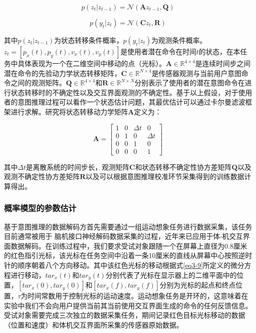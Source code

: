 \begin{equation}
\label{eq7}
p({z_t}|{z_{t - 1}}) = \mathcal{N}({\mathbf{A}}{z_{t - 1}},{{\mathbf{Q}}})
\end{equation}   

\begin{equation}
\label{eq8}
p({y_t}|{z_t}) = \mathcal{N}({\mathbf{C}}{z_t},{{\mathbf{R}}})
\end{equation}    

其中$p({z_t}|{z_{t - 1}})$为状态转移条件概率，$p({y_t}|{z_t})$为观测条件概率。${z_t} = [{p_x}(t),{p_y}(t),{v_x}(t),{v_y}(t)]$是使用者潜在命令在时间$t$的状态，在本任务中具体表现为一个在二维空间中移动的点（光标）。${\mathbf{A}} \in {\mathbb{R}^{4 \times 4}}$是连续时间步之间潜在命令的先验动力学状态转移矩阵，${\mathbf{C}} \in {\mathbb{R}^{N \times 4}}$是传感器观测与当前用户意图命令之间的观测矩阵。${{\mathbf{Q}}} \in {\mathbb{R}^{4 \times 4}}$和${{\mathbf{R}}} \in {\mathbb{R}^{N \times N}}$分别表示了使用者的潜在意图命令在进行状态转移时的不确定性以及交互界面观测的不确定性。基于以上假设，对于使用者的意图推理过程可以看作一个状态估计问题，其最优估计可以通过卡尔曼滤波框架进行求解。研究将状态转移动力学矩阵${\mathbf{A}}$定义为：

\begin{equation}
\mathbf{A} = 
\begin{bmatrix}{}
1&0&{\Delta t}&0  \\  
0&1&0&{\Delta t}  \\  
0&0&1&0  \\  
0&0&0&1 
\end{bmatrix}
\end{equation} 

其中$\Delta t$是离散系统的时间步长，观测矩阵${\mathbf{C}}$和状态转移不确定性协方差矩阵${{\mathbf{Q}}}$以及观测不确定性协方差矩阵${{\mathbf{R}}}$以及可以根据意图推理校准环节采集得到的训练数据计算得出。


\subsubsection{概率模型的参数估计}基于意图推理的数据解码方首先需要通过一组运动想象任务进行数据采集，该任务目前通常被用于 脑机接口神经解码数据采集的过程\cite{malikEfficientDecodingSteadyState2011,brandmanRapidCalibrationIntracortical2018}，近年来已应用于体-机交互界面数据解码\cite{seanez-gonzalezCursorControlKalman2014,seanez-gonzalezStaticDynamicDecoding2017}。在训练过程中，我们要求受试对象跟随一个在屏幕上直径为0.8厘米的红色指引光标，该光标在任务空间中沿着一条10厘米的直线从屏幕中心按照逆时针的顺序朝着八个方向移动。其中该红色光标的移动根据式\ref{eq3-9}所定义的微分方程进行移动\cite{seanez-gonzalezStaticDynamicDecoding2017}，$tar_x(t)$和$tar_y(t)$分别代表了光标在显示器上的二维平面中的位置，$[tar_x(0),tar_y(0)]$和$[tar_x(f),tar_y(f)]$分别为光标的起点和终点位置，$\tau$为时间常数用于控制光标的运动速度。运动想象任务是开环的，这意味着在实验中我们不会向用户提供当前其当前使用交互界面生成的命令的任何反馈信息。受试对象需要完成三次独立的数据采集任务，期间记录红色目标光标移动的数据（位置和速度）和体机交互界面所采集的传感器原始数据。

